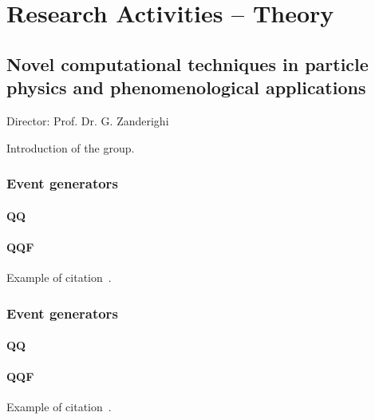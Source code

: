 \documentclass{FBR_Bericht_2025}
\begin{document}
\onecolumn
{}
\tableofcontents
\cleardoublepage

\twocolumn

\chapter{Research Activities -- Theory}
\section{Novel computational techniques in particle physics and phenomenological applications}
\begin{Namen}
Director: Prof. Dr. G. Zanderighi
\end{Namen}
Introduction of the group.

\subsection[Event generators]{Event generators}
\begin{refsection}
\subsubsection{QQ}
\subsubsection{QQF}
Example of citation~\cite{Biello:2024pgo}.
\end{refsection}

\subsection[Event generators]{Event generators}
\begin{refsection}
\subsubsection{QQ}
\subsubsection{QQF}
Example of citation~\cite{Biello:2024pgo}.
\printbibliography[heading=subbibliography]
\end{refsection}

\cite{FerrarioRavasio:2024kem}

\clearpage
\onecolumn
\end{document}
